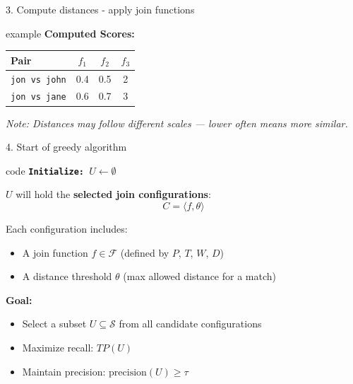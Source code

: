 \documentclass[8pt]{beamer} %
\begin{document}
\begin{frame}{3. Compute distances - apply join functions}
\begin{beamercolorbox}[rounded=true, shadow=true, leftskip=1em, rightskip=1em]{example}
		\vspace{0.5em}
		\textbf{Computed Scores:}
		\begin{tabular}{lccc}
			\textbf{Pair} & $f_1$ & $f_2$ & $f_3$ \\
			\hline
			\texttt{jon vs john} & 0.4 & 0.5 & 2 \\
			\texttt{jon vs jane} & 0.6 & 0.7 & 3 \\
		\end{tabular}
		
		\vspace{0.5em}
		\textit{Note: Distances may follow different scales — lower often means more similar.}
	\end{beamercolorbox}
\end{frame}




\begin{frame}{4. Start of greedy algorithm}
	
	\begin{beamercolorbox}[rounded=true, shadow=true, leftskip=1em, rightskip=1em]{code}
	\texttt{\textbf{Initialize:} $U \leftarrow \emptyset$}
	\end{beamercolorbox}
	
		
	\vspace{1em}
	$U$ will hold the \textbf{selected join configurations}:
	$$
	C = \langle f, \theta \rangle
	$$
	
	Each configuration includes:
	\begin{itemize}
		\item A join function $f \in \mathcal{F}$ (defined by $P$, $T$, $W$, $D$)
		\item A distance threshold $\theta$ (max allowed distance for a match)
	\end{itemize}
	
	\vspace{0.5em}
	\textbf{Goal:}
	\begin{itemize}
		\item Select a subset $U \subseteq \mathcal{S}$ from all candidate configurations
		\item Maximize recall: $TP(U)$
		\item Maintain precision: $\text{precision}(U) \geq \tau$
	\end{itemize}
	

\end{frame}
\end{document}
